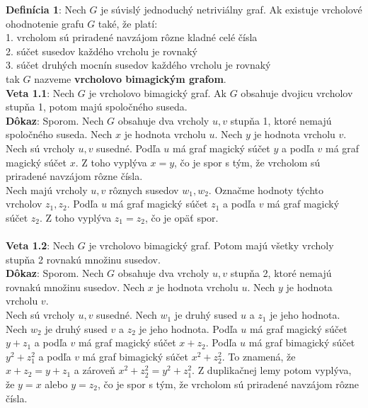 \documentclass[12pt]{article}
\begin{document}
\textbf{Definícia 1}: Nech $G$ je súvislý jednoduchý netriviálny graf. Ak existuje vrcholové ohodnotenie grafu $G$ také, že platí: \\
1. vrcholom sú priradené navzájom rôzne kladné celé čísla \\
2. súčet susedov každého vrcholu je rovnaký \\
3. súčet druhých mocnín susedov každého vrcholu je rovnaký \\
tak $G$ nazveme \textbf{vrcholovo bimagickým grafom}. \\

\textbf{Veta 1.1}: Nech $G$ je vrcholovo bimagický graf. Ak $G$ obsahuje dvojicu vrcholov stupňa 1, potom majú spoločného suseda. \\

\textbf{Dôkaz}: Sporom. Nech $G$ obsahuje dva vrcholy $u,v$ stupňa 1, ktoré nemajú spoločného suseda. Nech $x$ je hodnota vrcholu $u$. Nech $y$ je hodnota vrcholu $v$. \\

Nech sú vrcholy $u,v$ susedné. Podľa $u$ má graf magický súčet $y$ a podľa $v$ má graf magický súčet $x$. Z toho vyplýva $x = y$, čo je spor s tým, že vrcholom sú priradené navzájom rôzne čísla. \\

Nech majú vrcholy $u,v$ rôznych susedov $w_1, w_2$. Označme hodnoty týchto vrcholov $z_1, z_2$. Podľa $u$ má graf magický súčet $z_1$ a podľa $v$ má graf magický súčet $z_2$. Z toho vyplýva $z_1 = z_2$, čo je opäť spor. \\\\

\textbf{Veta 1.2}: Nech $G$ je vrcholovo bimagický graf. Potom majú všetky vrcholy stupňa 2 rovnakú množinu susedov. \\

\textbf{Dôkaz}: Sporom. Nech $G$ obsahuje dva vrcholy $u,v$ stupňa 2, ktoré nemajú rovnakú množinu susedov. Nech $x$ je hodnota vrcholu $u$. Nech $y$ je hodnota vrcholu $v$. \\

Nech sú vrcholy $u,v$ susedné. Nech $w_1$ je druhý sused $u$ a $z_1$ je jeho hodnota. Nech $w_2$ je druhý sused $v$ a $z_2$ je jeho hodnota. Podľa $u$ má graf magický súčet $y + z_1$ a podľa $v$ má graf magický súčet $x + z_2$. Podľa $u$ má graf bimagický súčet $y^2 + z^2_1$ a podľa $v$ má graf bimagický súčet $x^2 + z^2_2$.  To znamená, že $x + z_2 = y + z_1$ a zároveň $x^2 + z^2_2 = y^2 + z^2_1$. Z duplikačnej lemy potom vyplýva, že $y = x$ alebo $y = z_2$, čo je spor s tým, že vrcholom sú priradené navzájom rôzne čísla. \\
\end{document}
